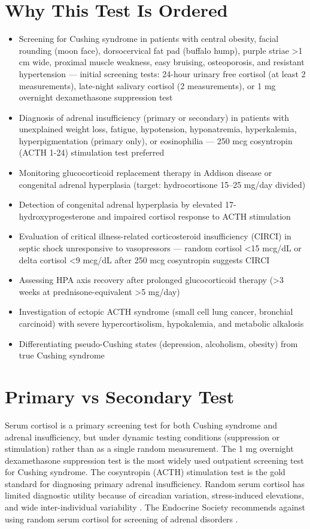 \section*{Why This Test Is Ordered}
\begin{itemize}
  \item Screening for Cushing syndrome in patients with central obesity, facial rounding (moon face), dorsocervical fat pad (buffalo hump), purple striae >1 cm wide, proximal muscle weakness, easy bruising, osteoporosis, and resistant hypertension --- initial screening tests: 24-hour urinary free cortisol (at least 2 measurements), late-night salivary cortisol (2 measurements), or 1 mg overnight dexamethasone suppression test \cite{nieman2015treatment}
  \item Diagnosis of adrenal insufficiency (primary or secondary) in patients with unexplained weight loss, fatigue, hypotension, hyponatremia, hyperkalemia, hyperpigmentation (primary only), or eosinophilia --- 250 mcg cosyntropin (ACTH 1-24) stimulation test preferred \cite{bancos2015diagnosis}
  \item Monitoring glucocorticoid replacement therapy in Addison disease or congenital adrenal hyperplasia (target: hydrocortisone 15--25 mg/day divided)
  \item Detection of congenital adrenal hyperplasia by elevated 17-hydroxyprogesterone and impaired cortisol response to ACTH stimulation
  \item Evaluation of critical illness-related corticosteroid insufficiency (CIRCI) in septic shock unresponsive to vasopressors --- random cortisol <15 mcg/dL or delta cortisol <9 mcg/dL after 250 mcg cosyntropin suggests CIRCI
  \item Assessing HPA axis recovery after prolonged glucocorticoid therapy (>3 weeks at prednisone-equivalent >5 mg/day)
  \item Investigation of ectopic ACTH syndrome (small cell lung cancer, bronchial carcinoid) with severe hypercortisolism, hypokalemia, and metabolic alkalosis
  \item Differentiating pseudo-Cushing states (depression, alcoholism, obesity) from true Cushing syndrome
\end{itemize}

\section*{Primary vs Secondary Test}
Serum cortisol is a primary screening test for both Cushing syndrome and adrenal insufficiency, but under dynamic testing conditions (suppression or stimulation) rather than as a single random measurement. The 1 mg overnight dexamethasone suppression test is the most widely used outpatient screening test for Cushing syndrome. The cosyntropin (ACTH) stimulation test is the gold standard for diagnosing primary adrenal insufficiency. Random serum cortisol has limited diagnostic utility because of circadian variation, stress-induced elevations, and wide inter-individual variability \cite{raff2003physiologic}. The Endocrine Society recommends against using random serum cortisol for screening of adrenal disorders \cite{findling2017diagnosis}.

